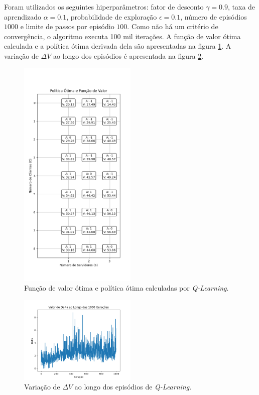Foram utilizados os seguintes hiperparâmetros: fator de desconto \( \gamma = 0.9 \), taxa de aprendizado \( \alpha = 0.1 \), probabilidade de exploração \( \epsilon = 0.1 \), número de episódios \( 1000 \) e limite de passos por episódio \( 100 \). Como não há um critério de convergência, o algoritmo executa 100 mil iterações. A função de valor ótima calculada e a política ótima derivada dela são apresentadas na figura \ref{fig:q_learning_policy_and_values}. A variação de \( \Delta V \) ao longo dos episódios é apresentada na figura \ref{fig:q_learning_delta}.

\begin{figure}[H]
    \centering
    \includegraphics[width=0.5\textwidth]{fig/q_learning_policy_and_values.png}
    \caption{Função de valor ótima e política ótima calculadas por \textit{Q-Learning}.}
    \label{fig:q_learning_policy_and_values}
\end{figure}

\begin{figure}[H]
    \centering
    \includegraphics[width=0.5\textwidth]{fig/q_learning_delta.png}
    \caption{Variação de \( \Delta V \) ao longo dos episódios de \textit{Q-Learning}.}
    \label{fig:q_learning_delta}
\end{figure}


